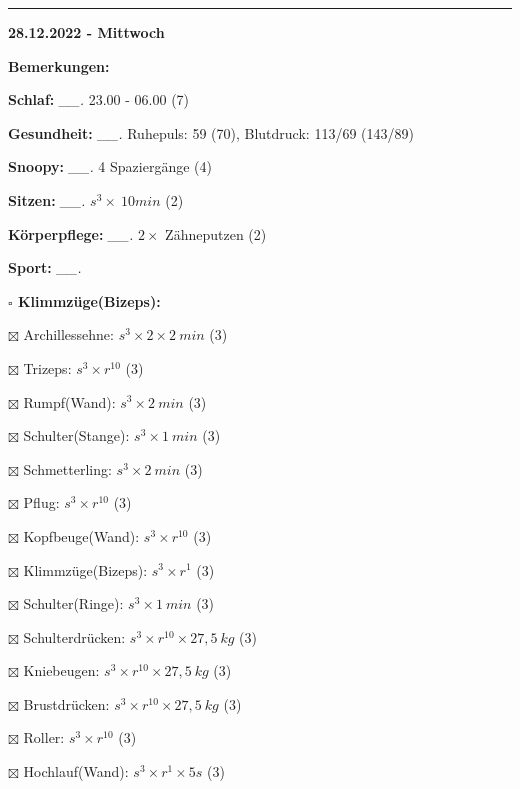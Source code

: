 \documentclass[10pt,a4paper]{article}
\newcommand\prop[1] {{\color {alizarin} {\bf #1}}}             %
\newcommand\rele[1] {{\color {english} \bf {#1}}}              %
\newcommand\mand[1] {{\color {burntorange} {\bf #1}}}          %
\newcommand\ddivide {\vskip -9pt \hrule \vskip 6pt}
\newcommand\topspace{\vskip -15pt \hskip 20pt}
\newcommand\n[1] { {\sl #1.} \hskip 5pt }
\begin{document}
\ddivide
{\rele {28.12.2022 - Mittwoch}}

\begin{mdframed}[style=daystyle]
  \begin{labeling}{{\mand {Bemerkungen:}}}
    \setlength\itemsep{-3pt}
  \item[{\mand {Schlaf:}}]        \n{\_\_} 23.00 - 06.00 (7)
  \item[{\mand {Gesundheit:}}]    \n{\_\_} Ruhepuls: 59 (70), Blutdruck: 113/69 (143/89)
  \item[{\mand {Snoopy:}}]        \n{\_\_} 4 Spaziergänge (4)
  \item[{\mand {Sitzen:}}]        \n{\_\_} $s^3 \times\ 10 min$ (2)
  \item[{\mand {Körperpflege:}}]  \n{\_\_} $2 \times$ Zähneputzen (2)
  \item[{\mand {Sport:}}]         \n{\_\_}
    \topspace
    \begin{minipage}{0.75\textwidth}  
      \begin{labeling}{\prop {$\square$ {Klimmzüge(Bizeps):}}}
        \setlength\itemsep{-3pt}
      \item[$\boxtimes$ Archillessehne:]    $s^3 \times 2 \times 2\ min$ (3)
      \item[$\boxtimes$ Trizeps:]           $s^3 \times r^{10}$ (3)
      \item[$\boxtimes$ Rumpf(Wand):]       $s^3 \times 2\ min$ (3)
      \item[$\boxtimes$ Schulter(Stange):]  $s^3 \times 1\ min$ (3)
      \item[$\boxtimes$ Schmetterling:]     $s^3 \times 2\ min$ (3)
      \item[$\boxtimes$ Pflug:]             $s^3 \times r^{10}$ (3)
      \item[$\boxtimes$ Kopfbeuge(Wand):]   $s^3 \times r^{10}$ (3)
      \item[$\boxtimes$ Klimmzüge(Bizeps):] $s^3 \times r^1$ (3)
      \item[$\boxtimes$ Schulter(Ringe):]   $s^3 \times 1\ min$ (3)
      \item[$\boxtimes$ Schulterdrücken:]   $s^3 \times r^{10} \times 27,5\ kg$ (3)
      \item[$\boxtimes$ Kniebeugen:]        $s^3 \times r^{10} \times 27,5\ kg$ (3)
      \item[$\boxtimes$ Brustdrücken:]      $s^3 \times r^{10} \times 27,5\ kg$ (3)
      \item[$\boxtimes$ Roller:]            $s^3 \times r^{10}$ (3)
      \item[$\boxtimes$ Hochlauf(Wand):]    $s^3 \times r^{1} \times 5s$ (3)

\end{labeling}
\end{minipage}
\end{labeling}
\end{mdframed}
\end{document}
